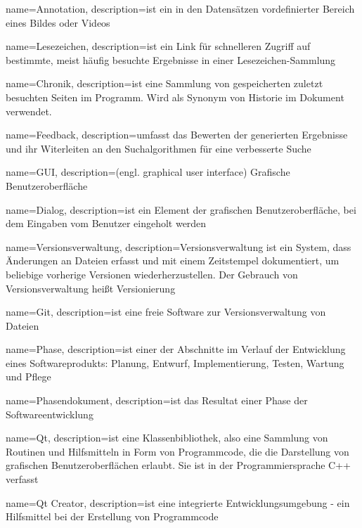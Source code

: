 {
name=Annotation,
description={ist ein in den Datensätzen vordefinierter Bereich eines Bildes oder Videos}
}

{
name=Lesezeichen,
description={ist ein Link für schnelleren Zugriff auf bestimmte, meist häufig besuchte Ergebnisse in einer Lesezeichen-Sammlung}
}

{
name=Chronik,
description={ist eine Sammlung von gespeicherten zuletzt besuchten Seiten im Programm. \newline Wird als Synonym von Historie im Dokument verwendet.}
}

{
name=Feedback,
description={umfasst das Bewerten der generierten Ergebnisse und ihr Witerleiten an den Suchalgorithmen für eine verbesserte Suche}
}



{
name=GUI,
description={(engl. graphical user interface) Grafische Benutzeroberfläche}
}

{
name=Dialog,
description={ist ein Element der grafischen Benutzeroberfläche, bei dem Eingaben vom Benutzer eingeholt werden}
}

{
name=Versionsverwaltung,
description={Versionsverwaltung ist ein System, dass Änderungen an Dateien erfasst und mit einem Zeitstempel dokumentiert, um beliebige vorherige Versionen wiederherzustellen. Der Gebrauch von Versionsverwaltung heißt Versionierung}
}

{
name=Git,
description={ist eine freie Software zur Versionsverwaltung von Dateien}
}

{
name=Phase,
description={ist einer der Abschnitte im Verlauf der Entwicklung eines Softwareprodukts: Planung, Entwurf, Implementierung, Testen, Wartung und Pflege}
}

{
name=Phasendokument,
description={ist das Resultat einer Phase der Softwareentwicklung}
}

{
name=Qt,
description={ist eine Klassenbibliothek, also eine Sammlung von Routinen und Hilfsmitteln in Form von Programmcode, die die Darstellung von grafischen Benutzeroberflächen erlaubt. Sie ist in der Programmiersprache C++ verfasst}
}

{
name=Qt Creator,
description={ist eine integrierte Entwicklungsumgebung - ein Hilfsmittel bei der Erstellung von Programmcode}
}

